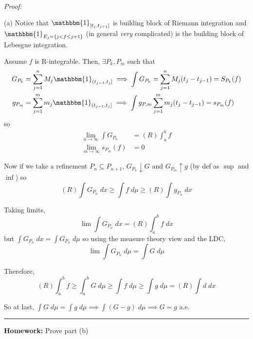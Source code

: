 \documentclass[12pt]{report}
\newcommand{\R}{\mathbb{R}}
\newcommand{\ind}{\mathbbm{1}}
\newcommand{\sub}{\subseteq}
\renewcommand{\div}{\vspace*{10pt}\hrule\vspace*{10pt}}
\newenvironment*{tbox}[2][gray]{
    \begin{tcolorbox}[
        parbox=false,
        colback=#1!5!white,
        colframe=#1!75!black,
        breakable,
        title={#2}
    ]}
    {\end{tcolorbox}}
\newenvironment*{exercise}[1][red]{
    \begin{tcolorbox}[
        parbox=false,
        colback=#1!5!white,
        colframe=#1!75!black,
        breakable
    ]}
    {\end{tcolorbox}}
\begin{document}
        \begin{tbox}{\textbf{Theorem:} Let $f$ be a bounded real function and $\mu$ the Lebesgue measure on $\R$. 
            \begin{enumerate}[(a)]
                \item If $f$ is Riemann integrable, then $f$ is Lebesgue integrable and $(R) \int_a^b f(x) \; dx = \int_a^b f \; d\mu$
                \item $f$ is Riemann integrable $\iff \{x: f(x) \text{ not continuous on } [a, b]\}$ has Lebesgue measure zero  
            \end{enumerate} }
            \emph{Proof:} 

            (a) Notice that $\ind_{[t_j, t_{j+1}]}$ is building block of Riemann integration and $\ind_{E_j = \{j < f \leq j+1\}}$ (in general \emph{very} complicated) is the building block of Lebesgue integration.

            Assume $f$ is R-integrable. Then, $\exists P_k, P_m$ such that
            \begin{align*}
                G_{P_k} &= \sum_{j=1}^{n} M_j \ind_{(t_{j-1}, t_j]} \implies \int G_{P_k} = \sum_{j=1}^{n} M_j(t_j - t_{j-1}) = S_{P_k}(f) \\ 
                g_{P_m} &= \sum_{j=1}^{m} m_j \ind_{(t_{j-1}, t_j]} \implies \int g_{P, m} \sum_{j=1}^{m} m_j(t_j - t_{j-1}) = s_{P_m}(f)
            \end{align*}
            so 
            \begin{align*}
                \lim_{n \to \infty } \int G_{P_n} &= (R)\int_a^b f\\ 
                \lim_{m \to \infty} s_{P_m}(f) &= 0
            \end{align*}

            Now if we take a refinement $P_n \sub P_{n+1}$, $G_{P_k} \downarrow G$ and $G_{P_m} \uparrow g$ (by def as $\sup$ and $\inf$) so 
            \[(R)\int G_{P_n} \; dx \geq \int f\; d\mu \geq (R)\int g_{P_n}\;dx\]

            Taking limits, 
            \[\lim \int G_{P_n}\; dx = (R)\int_a^b f\; dx\] 
            but $\int G_{P_n}\; dx = \int G_{P_n} \; d\mu$ so using the measure theory view and the LDC, 
            \[\lim \int G_{P_n} \; d\mu = \int G \; d\mu\]

            Therefore, 
           \[(R)\int_a^b f \geq \int_a^b G \; d\mu \geq \int f \; d\mu \geq \int g \; d\mu = (R)\int d \; dx\]  
           
            So at last, $\int G \; d\mu = \int g \; d\mu \implies \int (G - g) \; d\mu \implies G = g$ a.e. 

            \div 

            \begin{exercise}
                \textbf{Homework:} Prove part (b) 
            \end{exercise}
        \end{tbox}
\end{document}

